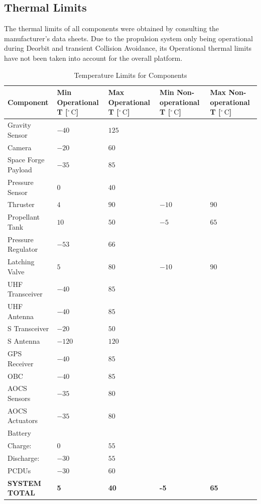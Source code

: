 \documentclass[a4paper, 11pt, conference]{IEEEtran}
\begin{document}
\subsection{Thermal Limits}

The thermal limits of all components were obtained by consulting the manufacturer's data sheets. Due to the propulsion system only being operational during Deorbit and transient Collision Avoidance, its Operational thermal limits have not been taken into account for the overall platform.

\begin{table}[!htbp]
\centering
\caption{Temperature Limits for Components}
\label{tab:temperature}
\begin{tabular}{l
    >{\raggedleft\arraybackslash}p{2.2cm}
    >{\raggedleft\arraybackslash}p{2.2cm}
    >{\raggedleft\arraybackslash}p{2.2cm}
    >{\raggedleft\arraybackslash}p{2.2cm}}
\toprule
\textbf{Component} & 
\textbf{Min Operational T [$^\circ\,\mathrm{C}$]} & 
\textbf{Max Operational T [$^\circ\,\mathrm{C}$]} & 
\textbf{Min Non-operational T [$^\circ\,\mathrm{C}$]} & 
\textbf{Max Non-operational T [$^\circ\,\mathrm{C}$]} \\
\midrule
Gravity Sensor & $-40$ & $125$ & & \\
Camera & $-20$ & $60$ & & \\
Space Forge Payload & $-35$ & $85$ & & \\
Pressure Sensor & $0$ & $40$ & & \\
Thruster & $4$ & $90$ & $-10$ & $90$ \\
Propellant Tank & $10$ & $50$ & $-5$ & $65$ \\
Pressure Regulator & $-53$ & $66$ & & \\
Latching Valve & $5$ & $80$ & $-10$ & $90$ \\
UHF Transceiver & $-40$ & $85$ & & \\
UHF Antenna & $-40$ & $85$ & & \\
S Transceiver & $-20$ & $50$ & & \\
S Antenna & $-120$ & $120$ & & \\
GPS Receiver & $-40$ & $85$ & & \\
OBC & $-40$ & $85$ & & \\
AOCS Sensors & $-35$ & $80$ & & \\
AOCS Actuators & $-35$ & $80$ & & \\
Battery & & & & \\
\quad Charge: & $0$ & $55$ & & \\
\quad Discharge: & $-30$ & $55$ & & \\
PCDUs & $-30$ & $60$ & & \\
\midrule
\textbf{SYSTEM TOTAL} & \textbf{5} & \textbf{40} & \textbf{-5} & \textbf{65} \\
\bottomrule
\end{tabular}
\end{table}
\end{document}
